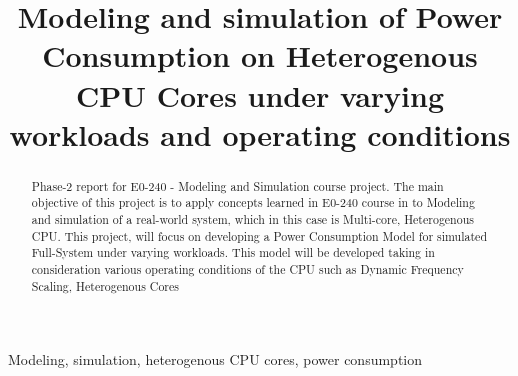 \documentclass[conference]{IEEEtran}
\begin{document}
\title{Modeling and simulation of Power Consumption on Heterogenous CPU Cores under varying workloads and operating conditions\\

}

\author{
\and
{}
\and
{}
\and
{}
}

\maketitle

\begin{abstract}
    Phase-2 report for E0-240 - Modeling and Simulation course project. The main objective of this project is to apply concepts learned in E0-240 course in to Modeling and simulation of a real-world system, which in this case is Multi-core, Heterogenous CPU. This project, will focus on developing a Power Consumption Model for simulated Full-System \cite{8718630} under varying workloads. This model will be developed taking in consideration various operating conditions of the CPU such as Dynamic Frequency Scaling, Heterogenous Cores \cite{arm-big.little-whitepaper}
\end{abstract}

\begin{IEEEkeywords}
    Modeling, simulation, heterogenous CPU cores, power consumption
\end{IEEEkeywords}
\end{document}
